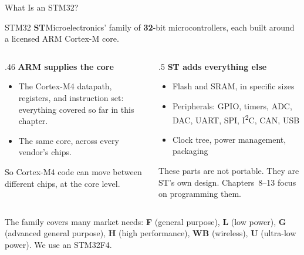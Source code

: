 \documentclass[9pt,aspectratio=169,xcolor=table]{beamer}
\begin{document}
{\beamerextras
\begin{frame}{What Is an STM32?}
    \begin{block}{STM32}
        \textbf{ST}Microelectronics' family of \textbf{32}-bit microcontrollers, each built around a licensed \alert{ARM Cortex-M} core.
    \end{block}
    \vspace{2mm}
    \begin{columns}[T]
    \begin{column}{.46\textwidth}
        \textbf{ARM supplies the core}
        \begin{itemize}
            \item The Cortex-M4 datapath, registers, and instruction set: everything covered so far in this chapter.
            \item The same core, across every vendor's chips.
        \end{itemize}
        \vspace{1mm}
        {\small So Cortex-M4 code can move between different chips, at the core level.}
    \end{column}
    \begin{column}{.5\textwidth}
        \textbf{ST adds everything else}
        \begin{itemize}
            \item Flash and SRAM, in specific sizes
            \item Peripherals: GPIO, timers, ADC, DAC, UART, SPI, I\textsuperscript{2}C, CAN, USB
            \item Clock tree, power management, packaging
        \end{itemize}
        \vspace{1mm}
        {\small These parts are \alert{not} portable. They are ST's own design. Chapters~8--13 focus on programming them.}
    \end{column}
    \end{columns}
    \vspace{2mm}
    {\small The family covers many market needs: \textbf{F} (general purpose), \textbf{L} (low power), \textbf{G} (advanced general purpose), \textbf{H} (high performance), \textbf{WB} (wireless), \textbf{U} (ultra-low power). We use an \alert{STM32F4}.}
\end{frame}
}
\end{document}
